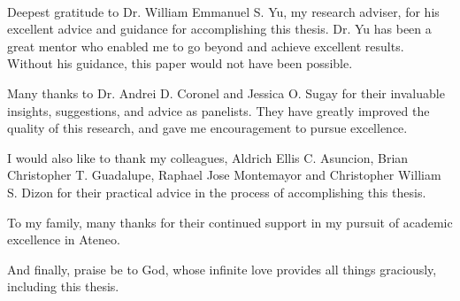 \begin{acknowledgments}


\paragraph{         }Deepest gratitude to Dr. William Emmanuel S. Yu, my research adviser, for his excellent advice and guidance for accomplishing this thesis. Dr. Yu has been a great mentor who enabled me to go beyond and achieve excellent results. Without his guidance, this paper would not have been possible.

Many thanks to Dr. Andrei D. Coronel and Jessica O. Sugay for their invaluable insights, suggestions, and advice as panelists. They have greatly improved the quality of this research, and gave me encouragement to pursue excellence.

I would also like to thank my colleagues, Aldrich Ellis C. Asuncion, Brian Christopher T. Guadalupe, Raphael Jose Montemayor and Christopher William S. Dizon for their practical advice in the process of accomplishing this thesis.

To my family, many thanks for their continued support in my pursuit of academic excellence in Ateneo.

And finally, praise be to God, whose infinite love provides all things graciously, including this thesis.


\end{acknowledgments}